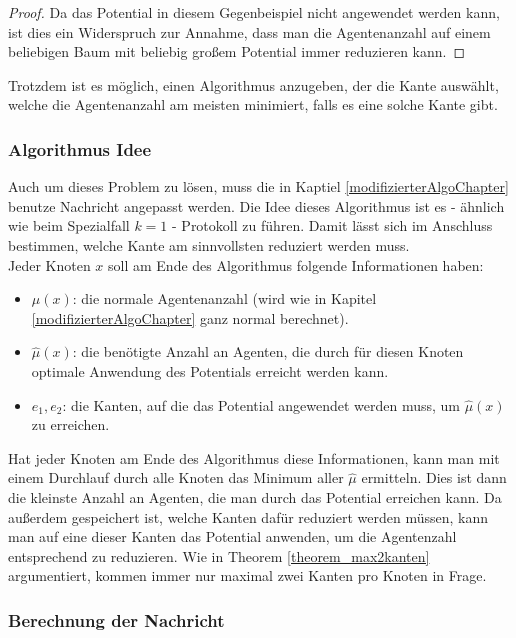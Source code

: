 \begin{proof}
	Da das Potential in diesem Gegenbeispiel nicht angewendet werden kann, ist dies ein Widerspruch zur Annahme, dass man die Agentenanzahl auf einem beliebigen Baum mit beliebig großem Potential immer reduzieren kann.
\end{proof}

Trotzdem ist es möglich, einen Algorithmus anzugeben, der die Kante auswählt, welche die Agentenanzahl am meisten minimiert, falls es eine solche Kante gibt.


\subsubsection{Algorithmus Idee}

	Auch um dieses Problem zu lösen, muss die in Kaptiel \ref{modifizierterAlgoChapter} benutze Nachricht angepasst werden. Die Idee dieses Algorithmus ist es - ähnlich wie beim Spezialfall $k = 1$ -  Protokoll zu führen. Damit lässt sich im Anschluss bestimmen, welche Kante am sinnvollsten reduziert werden muss.\\
	Jeder Knoten $x$ soll am Ende des Algorithmus folgende Informationen haben:
	\begin{itemize}
		\item $\mu(x)$: die normale Agentenanzahl (wird wie in Kapitel \ref{modifizierterAlgoChapter} ganz normal berechnet).
		\item $\hat{\mu}(x)$: die benötigte Anzahl an Agenten, die durch für diesen Knoten optimale Anwendung des Potentials erreicht werden kann.
		\item $e_{1}, e_{2}$: die Kanten, auf die das Potential angewendet werden muss, um $\hat{\mu}(x)$ zu erreichen.
	\end{itemize}
	Hat jeder Knoten am Ende des Algorithmus diese Informationen, kann man mit einem Durchlauf durch alle Knoten das Minimum aller $\hat{\mu}$ ermitteln. Dies ist dann die kleinste Anzahl an Agenten, die man durch das Potential erreichen kann. Da außerdem gespeichert ist, welche Kanten dafür reduziert werden müssen, kann man auf eine dieser Kanten das Potential anwenden, um die Agentenzahl entsprechend zu reduzieren. Wie in Theorem \ref{theorem_max2kanten} argumentiert, kommen immer nur maximal zwei Kanten pro Knoten in Frage.
	
	
\newpage
	
	\subsubsection{Berechnung der Nachricht}
	
